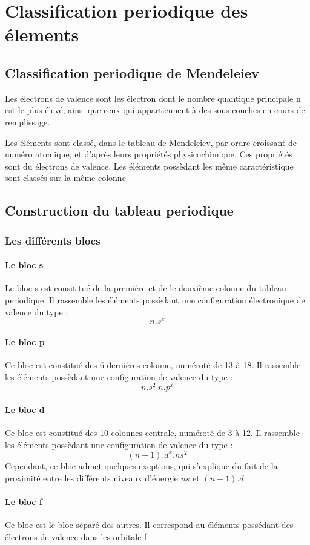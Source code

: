 \chapter{Classification periodique des élements}
\section{Classification periodique de Mendeleiev}
\begin{de}
Les électrons de valence sont les électron dont le nombre quantique principale n est le plus élevé, ainsi que ceux qui appartiennent à des sous-couches en cours de remplissage.
\end{de}
Les éléments sont classé, dans le tableau de Mendeleiev, par ordre croissant de numéro atomique, et d'après leurs propriétés physicochimique. Ces propriétés sont du électrons de valence. Les éléments possèdant les même caractéristique sont classés sur la même colonne
\section{Construction du tableau periodique}
\subsection{Les différents blocs}
\subsubsection{Le bloc s}
Le bloc s est consititué de la première et de le deuxième colonne du tableau periodique. Il rassemble les éléments possèdant une configuration électronique de valence du type : 
$$n.s^x$$
\subsubsection{Le bloc p}
Ce bloc est constitué des 6 dernières colonne, numéroté de 13 à 18. Il rassemble les éléments possèdant une configuration de valence du type : 
$$n.s^2.n.p^x$$
\subsubsection{Le bloc d}
Ce bloc est constitué des 10 colonnes centrale, numéroté de 3 à 12. Il rassemble les éléments possèdant une configuration de valence du type : 
$$(n-1).d^x.ns^2$$
Cependant, ce bloc admet quelques exeptions, qui s'explique du fait de la proximité entre les différents niveaux d'énergie $ns$ et $(n-1).d$.
\subsubsection{Le bloc f}
Ce bloc est le bloc séparé des autres. Il correspond au éléments possédant des électrons de valence dans les orbitale f.
